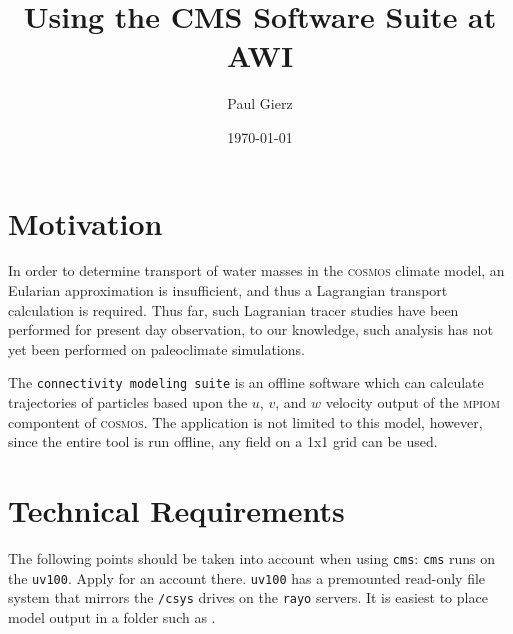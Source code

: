 \documentclass[11pt]{report}
\begin{document}
\title{Using the CMS Software Suite at AWI}
\author{Paul Gierz}
\date{\today}
\maketitle

\section*{Motivation}
In order to determine transport of water masses in the \textsc{cosmos} climate model, an Eularian approximation is insufficient, and thus a Lagrangian transport calculation is required. Thus far, such Lagranian tracer studies have been performed for present day observation, to our knowledge, such analysis has not yet been performed on paleoclimate simulations.

The \texttt{connectivity modeling suite} is an offline software which can calculate trajectories of particles based upon the $u$, $v$, and $w$ velocity output of the \textsc{mpiom} compontent of \textsc{cosmos}. The application is not limited to this model, however, since the entire tool is run offline, any field on a 1x1 grid can be used.

\section*{Technical Requirements}
The following points should be taken into account when using \texttt{cms}:
\texttt{cms} runs on the \texttt{uv100}. Apply for an account there.
\texttt{uv100} has a premounted read-only file system that mirrors the \texttt{/csys} drives on the \texttt{rayo} servers. It is easiest to place model output in a folder such as \texttt{}.
\end{document}
